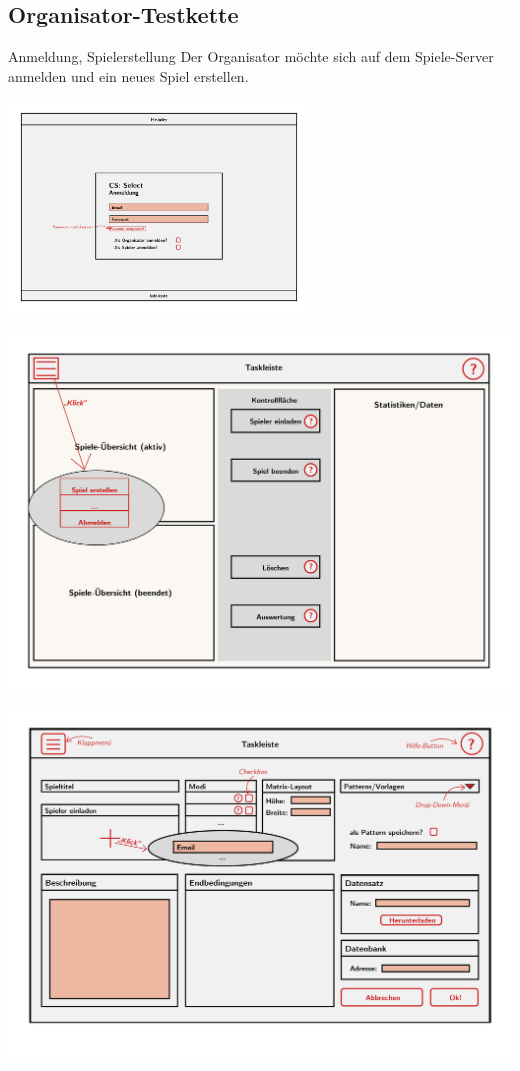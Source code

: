 \documentclass[xcolor=dvipsnames]{beamer}
\begin{document}
    \subsection{Organisator-Testkette}
    \begin{frame}
        \begin{block} {Anmeldung, Spielerstellung}
            Der Organisator möchte sich auf dem Spiele-Server anmelden und ein neues Spiel erstellen.
        \end{block}
        \includegraphics[width=8cm]{img/Anmeldung.jpg}
    \end{frame}
    \begin{frame}
        \includegraphics[width=\textwidth]{img/OrganisatorPres.jpg}
    \end{frame}
    \begin{frame}
         \includegraphics[width=\textwidth]{img/Spielerstellung.jpg}
    \end{frame}
\end{document}
